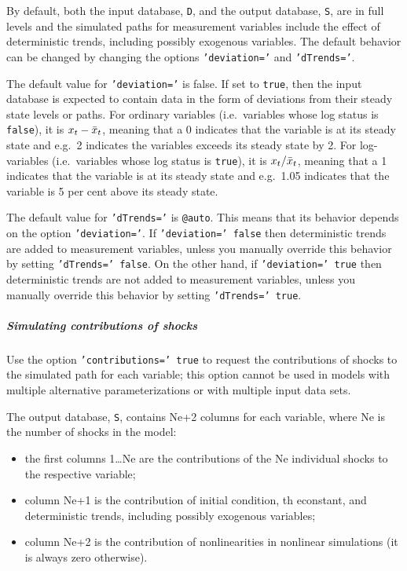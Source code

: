 By default, both the input database, \texttt{D}, and the output
database, \texttt{S}, are in full levels and the simulated paths for
measurement variables include the effect of deterministic trends,
including possibly exogenous variables. The default behavior can be
changed by changing the options \texttt{'deviation='} and
\texttt{'dTrends='}.

The default value for \texttt{'deviation='} is false. If set to
\texttt{true}, then the input database is expected to contain data in
the form of deviations from their steady state levels or paths. For
ordinary variables (i.e.~variables whose log status is \texttt{false}),
it is $x_t-\Bar x_t$, meaning that a 0 indicates that the variable is at
its steady state and e.g.~2 indicates the variables exceeds its steady
state by 2. For log-variables (i.e.~variables whose log status is
\texttt{true}), it is $x_t/\Bar x_t$, meaning that a 1 indicates that
the variable is at its steady state and e.g.~1.05 indicates that the
variable is 5 per cent above its steady state.

The default value for \texttt{'dTrends='} is \texttt{@auto}. This means
that its behavior depends on the option \texttt{'deviation='}. If
\texttt{'deviation=' false} then deterministic trends are added to
measurement variables, unless you manually override this behavior by
setting \texttt{'dTrends=' false}. On the other hand, if
\texttt{'deviation=' true} then deterministic trends are not added to
measurement variables, unless you manually override this behavior by
setting \texttt{'dTrends=' true}.

\subparagraph{Simulating contributions of
shocks}\label{simulating-contributions-of-shocks}

Use the option \texttt{'contributions=' true} to request the
contributions of shocks to the simulated path for each variable; this
option cannot be used in models with multiple alternative
parameterizations or with multiple input data sets.

The output database, \texttt{S}, contains Ne+2 columns for each
variable, where Ne is the number of shocks in the model:

\begin{itemize}
\item
  the first columns 1\ldots{}Ne are the contributions of the Ne
  individual shocks to the respective variable;
\item
  column Ne+1 is the contribution of initial condition, th econstant,
  and deterministic trends, including possibly exogenous variables;
\item
  column Ne+2 is the contribution of nonlinearities in nonlinear
  simulations (it is always zero otherwise).
\end{itemize}

